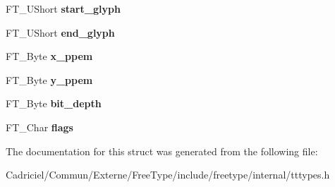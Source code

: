 \begin{DoxyCompactItemize}
\item 
\hypertarget{struct_t_t___s_bit___strike_rec___a05032d4092eef7e7214bb82d4113d8b9}{F\-T\-\_\-\-U\-Short {\bfseries start\-\_\-glyph}}\label{struct_t_t___s_bit___strike_rec___a05032d4092eef7e7214bb82d4113d8b9}

\item 
\hypertarget{struct_t_t___s_bit___strike_rec___a1af21e0ef936193b22575ea75bad487f}{F\-T\-\_\-\-U\-Short {\bfseries end\-\_\-glyph}}\label{struct_t_t___s_bit___strike_rec___a1af21e0ef936193b22575ea75bad487f}

\item 
\hypertarget{struct_t_t___s_bit___strike_rec___a2a1b17c24df2084fe485aefe8f34e7d4}{F\-T\-\_\-\-Byte {\bfseries x\-\_\-ppem}}\label{struct_t_t___s_bit___strike_rec___a2a1b17c24df2084fe485aefe8f34e7d4}

\item 
\hypertarget{struct_t_t___s_bit___strike_rec___ad618814b841b86e7763f1aa371e04fed}{F\-T\-\_\-\-Byte {\bfseries y\-\_\-ppem}}\label{struct_t_t___s_bit___strike_rec___ad618814b841b86e7763f1aa371e04fed}

\item 
\hypertarget{struct_t_t___s_bit___strike_rec___ac57b360af4620bd06251d098f5da23bb}{F\-T\-\_\-\-Byte {\bfseries bit\-\_\-depth}}\label{struct_t_t___s_bit___strike_rec___ac57b360af4620bd06251d098f5da23bb}

\item 
\hypertarget{struct_t_t___s_bit___strike_rec___a38735f8c00b23deb25ffab798c0aa7b7}{F\-T\-\_\-\-Char {\bfseries flags}}\label{struct_t_t___s_bit___strike_rec___a38735f8c00b23deb25ffab798c0aa7b7}

\end{DoxyCompactItemize}


The documentation for this struct was generated from the following file\-:\begin{DoxyCompactItemize}
\item 
Cadriciel/\-Commun/\-Externe/\-Free\-Type/include/freetype/internal/tttypes.\-h\end{DoxyCompactItemize}
